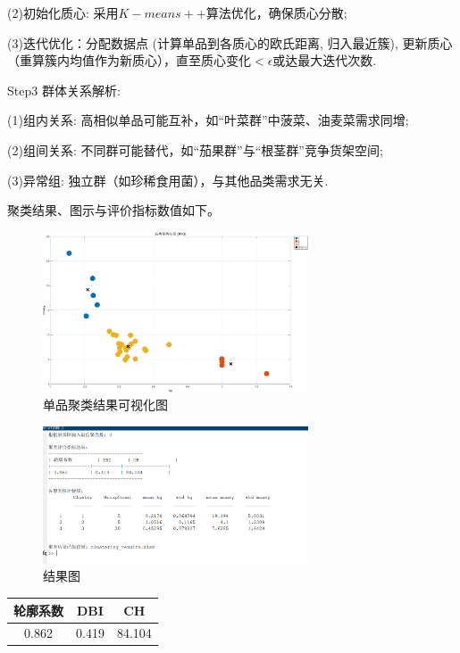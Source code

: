 \documentclass{cumcmthesis}
\begin{document}
    


    (2)初始化质心: 采用$K-means++$算法优化，确保质心分散; 

    (3)迭代优化：分配数据点 (计算单品到各质心的欧氏距离, 归入最近簇), 更新质心（重算簇内均值作为新质心），直至质心变化$<\epsilon$或达最大迭代次数. 
    
    Step3 群体关系解析: 

    (1)组内关系: 高相似单品可能互补，如“叶菜群”中菠菜、油麦菜需求同增; 

    (2)组间关系: 不同群可能替代，如“茄果群”与“根茎群”竞争货架空间; 

    (3)异常组: 独立群（如珍稀食用菌），与其他品类需求无关. 


 聚类结果、图示与评价指标数值如下。

\begin{figure}[H]
    \centering
    \includegraphics[width=0.7\textwidth]{聚类结果可视化.png}
    \caption{单品聚类结果可视化图}
\end{figure}


\begin{figure}[H]
    \centering
    \includegraphics[width=0.7\textwidth]{结果.png}
    \caption{结果图}
\end{figure}


\begin{table}[H]
    \centering
    \begin{tabular}{c c c}
    \toprule
    轮廓系数 & DBI & CH \\
    \midrule
    0.862 & 0.419 & 84.104 \\
    \bottomrule
    \end{tabular}
\end{table}
\end{document}
